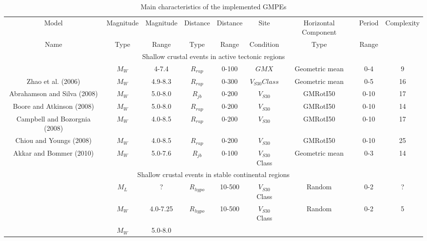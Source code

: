 \begin{landscape}
\begin{table}[!t]
\renewcommand{\arraystretch}{1.3}
\caption{Main characteristics of the implemented GMPEs}
\label{GMPEs} \centering
\begin{tabular}{|c|c|c|c|c|c|c|c|c|}
\hline {\footnotesize Model} & {\footnotesize Magnitude} &
{\footnotesize Magnitude} & {\footnotesize Distance} &
{\footnotesize Distance} & {\footnotesize Site}
& {\footnotesize Horizontal Component} & {\footnotesize Period} & {\footnotesize Complexity}  \\
{\footnotesize Name} & {\footnotesize Type} & {\footnotesize Range}
& {\footnotesize Type} & {\footnotesize Range} & {\footnotesize
Condition}
& {\footnotesize Type} & {\footnotesize Range} &\\
\hline \multicolumn{9}{|c|}{Shallow crustal events in active
tectonic regions}\\
\hline {\footnotesize \citet{eqrm_Sadigh97a}} & $M_W$ & 4-7.4 &
$R_{rup}$ &
0-100& $GMX$ & Geometric mean & 0-4 & 9\\
\hline {\footnotesize Zhao et al. (2006)} & $M_W$ & 4.9-8.3 &
$R_{rup}$ &
0-300& $V_{S30} Class$ & Geometric mean & 0-5 & 16\\
\hline {\footnotesize Abrahamson and Silva (2008)} & $M_W$ & 5.0-8.0
&
$R_{jb}$ & 0-200 & $V_{S30}$ & GMRotI50 & 0-10 & 17\\
\hline {\footnotesize Boore and Atkinson (2008)} & $M_W$ & 5.0-8.0 &
$R_{rup}$ & 0-200 & $V_{S30}$ & GMRotI50 & 0-10 & 14\\
\hline {\footnotesize Campbell and Bozorgnia (2008)} & $M_W$ &
4.0-8.5 &
$R_{rup}$ & 0-200 & $V_{S30}$ & GMRotI50 & 0-10 & 17\\
\hline {\footnotesize Chiou and Youngs (2008)} & $M_W$ & 4.0-8.5 &
$R_{rup}$ & 0-200 & $V_{S30}$ & GMRotI50 & 0-10 & 25\\
\hline {\footnotesize Akkar and Bommer (2010)} & $M_W$ & 5.0-7.6 &
$R_{jb}$
& 0-100& $V_{S30}$ Class & Geometric mean & 0-3 & 14\\
\hline \multicolumn{9}{|c|}{Shallow crustal events in stable
continental regions}\\
\hline {\footnotesize \citet{dr_Gaull90a}} & $M_L$ & ?  &
$R_{hypo}$& 10-500& $V_{S30}$ Class & Random & 0-2 & ?\\
\hline {\footnotesize \citet{dr_Atkinson97a}} & $M_W$ & 4.0-7.25 &
$R_{hypo}$& 10-500& $V_{S30}$ Class & Random & 0-2 & 5\\
\hline {\footnotesize \citet{eqrm_Toro97a}} & $M_W$ & 5.0-8.0 &

\end{tabular}
\end{table}
\end{landscape}
